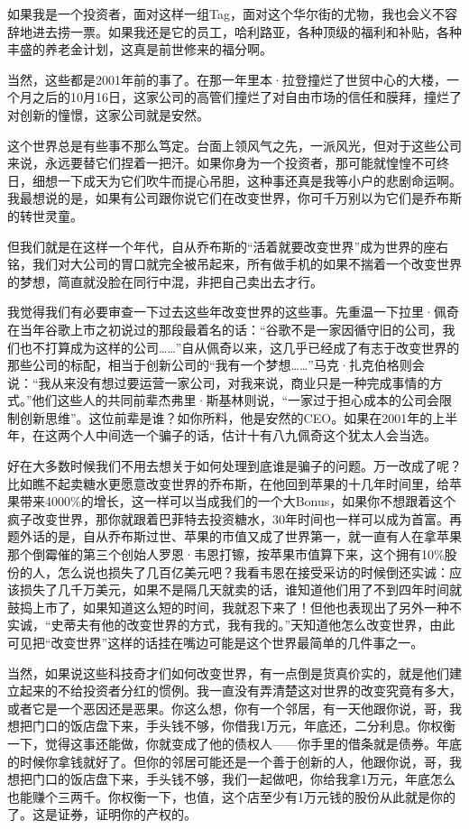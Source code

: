 如果我是一个投资者，面对这样一组Tag，面对这个华尔街的尤物，我也会义不容辞地进去捞一票。如果我还是它的员工，哈利路亚，各种顶级的福利和补贴，各种丰盛的养老金计划，这真是前世修来的福分啊。

当然，这些都是2001年前的事了。在那一年里本·拉登撞烂了世贸中心的大楼，一个月之后的10月16日，这家公司的高管们撞烂了对自由市场的信任和膜拜，撞烂了对创新的憧憬，这家公司就是安然。

这个世界总是有些事不那么笃定。台面上领风气之先，一派风光，但对于这些公司来说，永远要替它们捏着一把汗。如果你身为一个投资者，那可能就惶惶不可终日，细想一下成天为它们吹牛而提心吊胆，这种事还真是我等小户的悲剧命运啊。我最想说的是，如果有公司跟你说它们在改变世界，你可千万别以为它们是乔布斯的转世灵童。

但我们就是在这样一个年代，自从乔布斯的``活着就要改变世界''成为世界的座右铭，我们对大公司的胃口就完全被吊起来，所有做手机的如果不揣着一个改变世界的梦想，简直就没脸在同行中混，非把自己卖出去才行。

我觉得我们有必要审查一下过去这些年改变世界的这些事。先重温一下拉里·佩奇在当年谷歌上市之初说过的那段最着名的话：``谷歌不是一家因循守旧的公司，我们也不打算成为这样的公司\ldots{}\ldots{}''自从佩奇以来，这几乎已经成了有志于改变世界的那些公司的标配，相当于创新公司的``我有一个梦想\ldots{}\ldots{}''马克·扎克伯格则会说：``我从来没有想过要运营一家公司，对我来说，商业只是一种完成事情的方式。''他们这些人的共同前辈杰弗里·斯基林则说，``一家过于担心成本的公司会限制创新思维''。这位前辈是谁？如你所料，他是安然的CEO。如果在2001年的上半年，在这两个人中间选一个骗子的话，估计十有八九佩奇这个犹太人会当选。

好在大多数时候我们不用去想关于如何处理到底谁是骗子的问题。万一改成了呢？比如瞧不起卖糖水更愿意改变世界的乔布斯，在他回到苹果的十几年时间里，给苹果带来4000\%的增长，这一样可以当成我们的一个大Bonus，如果你不想跟着这个疯子改变世界，那你就跟着巴菲特去投资糖水，30年时间也一样可以成为首富。再题外话的是，自从乔布斯过世、苹果的市值又成了世界第一，就一直有人在拿苹果那个倒霉催的第三个创始人罗恩·韦恩打镲，按苹果市值算下来，这个拥有10\%股份的人，怎么说也损失了几百亿美元吧？我看韦恩在接受采访的时候倒还实诚：应该损失了几千万美元，如果不是隔几天就卖的话，谁知道他们用了不到四年时间就鼓捣上市了，如果知道这么短的时间，我就忍下来了！但他也表现出了另外一种不实诚，``史蒂夫有他的改变世界的方式，我有我的。''天知道他怎么改变世界，由此可见把``改变世界''这样的话挂在嘴边可能是这个世界最简单的几件事之一。

当然，如果说这些科技奇才们如何改变世界，有一点倒是货真价实的，就是他们建立起来的不给投资者分红的惯例。我一直没有弄清楚这对世界的改变究竟有多大，或者它是一个恶因还是恶果。你这么想，你有一个邻居，有一天他跟你说，哥，我想把门口的饭店盘下来，手头钱不够，你借我1万元，年底还，二分利息。你权衡一下，觉得这事还能做，你就变成了他的债权人------你手里的借条就是债券。年底的时候你拿钱就好了。但你的邻居可能还是一个善于创新的人，他跟你说，哥，我想把门口的饭店盘下来，手头钱不够，我们一起做吧，你给我拿1万元，年底怎么也能赚个三两千。你权衡一下，也值，这个店至少有1万元钱的股份从此就是你的了。这是证券，证明你的产权的。

